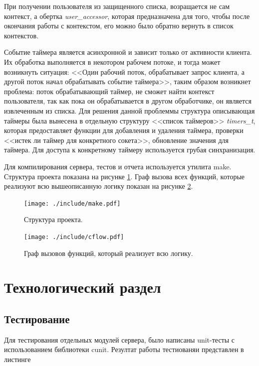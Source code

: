 \documentclass[a4paper,12pt]{report}
\begin{document}
	При получении пользователя из защищенного списка, возращается не сам контекст, а обертка \textit{user\_accessor}, которая предназначена для того, чтобы после окончания работы с контекстом, его можно было обратно вернуть в список контекстов. 

	Событие таймера является асинхронной и зависит только от активности клиента. Их обработка выполняется в некотором рабочем потоке, и тогда может возникнуть ситуация: <<Один рабочий поток, обрабатывает запрос клиента, а другой поток начал обрабатывать событие таймера>>, таким образом возникнет проблема: поток обрабатывающий таймер, не сможет найти контекст пользователя, так как пока он обрабатывается в другом обработчике, он является извлеченным из списка. Для решения данной проблеммы структура описывающая таймеры была вынесена в отдельную структуру <<список таймеров>> \textit{timers\_t}, которая предоставляет функции для добавления и удаления таймера, проверки <<истек ли таймер для конкретного сокета>>, обновление значения для таймера. Для доступа к конкретному таймеру используется грубая синхранизация.

	Для компилирования сервера, тестов и отчета используется утилита make. Структура проекта показана на рисунке \ref{fig:make_server}. Граф вызова всех функций, которые реализуют всю вышеописанную логику показан на рисунке \ref{fig:cflow}.

	\begin{figure}[H]
	\centering
	\texttt{[image: ./include/make.pdf]}
	\caption{Структура проекта.}
	\label{fig:make_server}
	\end{figure}

	
	\begin{figure}[H]
	\centering
	\texttt{[image: ./include/cflow.pdf]}
	\caption{Граф вызовов функций, который реализует всю логику.}
	\label{fig:cflow}
	\end{figure}


 \chapter{Технологический раздел}

	\section{Тестирование}
		Для тестирования отдельных модулей сервера, было написаны unit-тесты
		с использованием библиотеки cunit. Резултат работы тестиованяи представлен
		в листинге 
		
\end{document}
